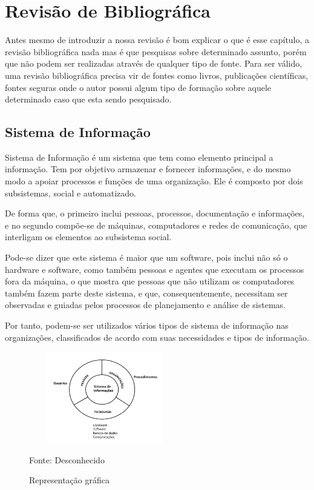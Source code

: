 \section{Revisão de Bibliográfica}
\vspace*{1cm}
Antes mesmo de introduzir a nossa revisão é bom explicar o que é esse capítulo, a revisão bibliográfica nada mas é que pesquisas sobre determinado assunto, porém que não podem ser realizadas através de qualquer tipo de fonte. Para ser válido, uma
revisão bibliográfica precisa vir de fontes como livros, publicações científicas, fontes seguras onde o autor possui algum tipo de formação sobre aquele determinado
caso que esta sendo pesquisado.

\subsection{Sistema de Informação}
  
Sistema de Informação é um sistema que tem como elemento principal a informação. Tem por objetivo armazenar e fornecer informações, e do mesmo modo a apoiar processos e funções de uma organização. 
Ele é composto por dois subsistemas, social e automatizado.

De forma que, o primeiro inclui pessoas, processos, documentação e informações, e no segundo compõe-se de máquinas, computadores e redes de comunicação, que interligam os elementos ao subsistema social. 

Pode-se dizer que este sistema é maior que um software, pois inclui não só o hardware e software, como também pessoas e agentes que executam os processos fora da máquina, o que mostra que pessoas que não utilizam os computadores também fazem parte deste sistema, e que, consequentemente, necessitam ser observadas e guiadas pelos processos de planejamento e análise de sistemas. 

Por tanto, podem-se ser utilizados vários tipos de sistema de informação nas organizações, classificados de acordo com suas necessidades e tipos de informação.
 \begin{figure}[!h]
	\centering
	\caption{Representação gráfica}
	\includegraphics[width=250px, height=150px]{./images/2-1.png}
	\par{Fonte: Desconhecido}
\end{figure}
\newpage

